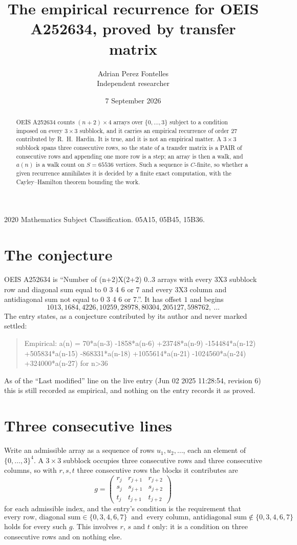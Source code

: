 \documentclass[11pt,a4paper]{article}
\title{The empirical recurrence for OEIS A252634, proved by transfer matrix}
\author{Adrian Perez Fontelles\\ \small Independent researcher}
\date{7 September 2026}
\theoremstyle{plain}
\theoremstyle{definition}
\begin{document}
\maketitle

\begin{abstract}
OEIS A252634 counts $(n+2)\times4$ arrays over $\{0,\dots,3\}$ subject to a condition imposed on
every $3\times3$ subblock, and it carries an empirical recurrence of order $27$
contributed by R.~H.~Hardin. It is true, and it is not an empirical matter. A $3\times3$
subblock spans three consecutive rows, so the state of a transfer matrix is a PAIR of
consecutive rows and appending one more row is a step; an array is then a walk, and
$a(n)$ is a walk count on $S=65536$ vertices. Such a sequence is $C$-finite, so whether a given
recurrence annihilates it is decided by a finite exact computation, with the Cayley--Hamilton
theorem bounding the work.
\end{abstract}

\noindent\small 2020 Mathematics Subject Classification. 05A15, 05B45, 15B36.\normalsize

\section{The conjecture}

OEIS A252634 is ``Number of (n+2)X(2+2) 0..3 arrays with every 3X3 subblock row and diagonal sum equal to 0 3 4 6 or 7 and every 3X3 column and antidiagonal sum not equal to 0 3 4 6 or 7.''. It has offset $1$ and begins
\[
1013, 1684, 4226, 10259, 28978, 80304, 205127, 598762,\ \dots
\]
The entry states, as a conjecture contributed by its author and never marked settled:
\begin{quote}
Empirical: a(n) = 70*a(n-3) -1858*a(n-6) +23748*a(n-9) -154484*a(n-12) +505834*a(n-15) -868331*a(n-18) +1055614*a(n-21) -1024560*a(n-24) +324000*a(n-27) for n>36
\end{quote}
As of the ``Last modified'' line on the live entry (Jun 02 2025 11:28:54, revision 6) this is still
recorded as empirical, and nothing on the entry records it as proved.

\section{Three consecutive lines}

Write an admissible array as a sequence of rows $u_1,u_2,\dots$, each an element of
$\{0,\dots,3\}^{4}$. A $3\times3$ subblock occupies three consecutive rows and
three consecutive columns, so with $r,s,t$ three consecutive rows the blocks it
contributes are
\[
g=\begin{pmatrix}r_j&r_{j+1}&r_{j+2}\\ s_j&s_{j+1}&s_{j+2}\\ t_j&t_{j+1}&t_{j+2}\end{pmatrix}
\]
for each admissible index, and the entry's condition is the requirement that
\[
\text{every row, diagonal sum} \in \{0,3,4,6,7\}\ \text{ and }\ \text{every column, antidiagonal sum} \notin \{0,3,4,6,7\}
\]
holds for every such $g$. This involves $r$, $s$ and $t$ only: it is a condition on
three consecutive rows and on nothing else.
\end{document}
